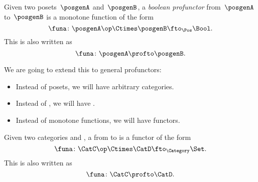 \begin{ctdefinition}
	\label{def:boolean-profunctor-again}
	Given two posets~$\posgenA$ and~$\posgenB$, a \emph{boolean profunctor} from~$\posgenA$ to~$\posgenB$ is a monotone function of the form
	\begin{equation}
		\label{eq:boolean-profunctor-funa}
		\funa\colon \posgenA\op \Ctimes \posgenB \fto_{\Pos} \Bool.
	\end{equation}
	This is also written as
	\begin{equation}
		\funa\colon \posgenA \profto \posgenB.
	\end{equation}
\end{ctdefinition}

We are going to extend this to general profunctors:
\begin{itemize}
	\item Instead of posets, we will have arbitrary categories.
	\item Instead of \Bool, we will have \Set.
	\item Instead of monotone functions, we will have functors.
\end{itemize}

\begin{ctdefinition}[Profunctors]
	\label{def:profunctor}
	Given two categories \CatC and \CatD, a \emph{} from \CatC to \CatD is a functor of the form
	\begin{equation}
		\label{eq:profunctors-def-1}
		\funa\colon \CatC\op \Ctimes \CatD \fto_{\Category} \Set.
	\end{equation}
	This is also written as
	\begin{equation}
		\label{eq:profunctors-def-2}
		\funa\colon \CatC \profto \CatD.
	\end{equation}
\end{ctdefinition}

